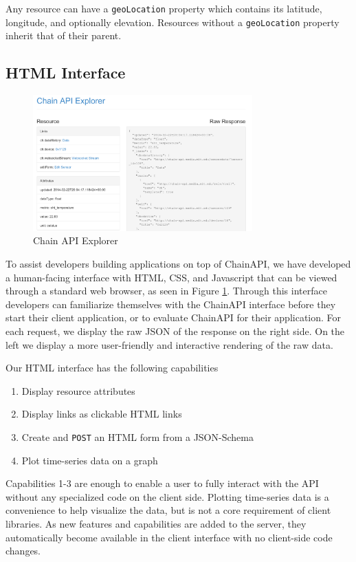 \documentclass{acm_proc_article-sp}
\newenvironment{tightenumerate}{
    \vspace{-10pt}
    \begin{enumerate}
        \setlength{\parskip}{-1pt}}{
    \end{enumerate}
    \vspace{-10pt}}
\begin{document}
Any resource can have a \texttt{geoLocation} property which contains its
latitude, longitude, and optionally elevation. Resources without a
\texttt{geoLocation} property inherit that of their parent.

\subsection{HTML Interface}

\begin{figure}
    \centering
    \includegraphics[width=8.45cm, frame]{chain_explorer2}
    \caption{Chain API Explorer}
    \label{chain_explorer}
\end{figure}

To assist developers building applications on top of ChainAPI, we have
developed a human-facing interface with HTML, CSS, and Javascript that can be
viewed through a standard web browser, as seen in Figure \ref{chain_explorer}.
Through this interface developers can familiarize themselves with the ChainAPI
interface before they start their client application, or to evaluate ChainAPI
for their application. For each request, we display the raw JSON of the
response on the right side. On the left we display a more user-friendly and
interactive rendering of the raw data.

Our HTML interface has the following capabilities

\begin{tightenumerate}
    \item Display resource attributes
    \item Display links as clickable HTML links
    \item Create and \texttt{POST} an HTML form from a JSON-Schema
    \item Plot time-series data on a graph
\end{tightenumerate}

Capabilities 1-3 are enough to enable a user to fully interact with the API
without any specialized code on the client side. Plotting time-series data is a
convenience to help visualize the data, but is not a core requirement of client
libraries. As new features and capabilities are added to the server, they
automatically become available in the client interface with no client-side code
changes.
\end{document}
